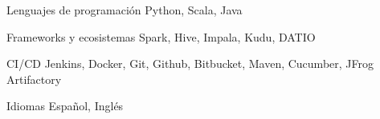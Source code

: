 

\begin{cvskills}

  \cvskill
    {Lenguajes de programación} %
    {Python, Scala, Java} %

  \cvskill
    {Frameworks y ecosistemas} %
    {Spark, Hive, Impala, Kudu, DATIO} %

  \cvskill
    {CI/CD} %
    {Jenkins, Docker, Git, Github, Bitbucket, Maven, Cucumber, JFrog Artifactory} %

  \cvskill
    {Idiomas} %
    {Español, Inglés} %

\end{cvskills}
